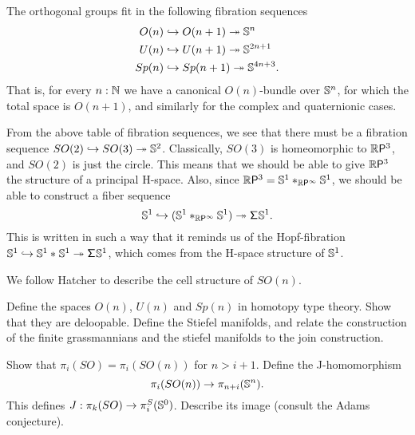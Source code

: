 \documentclass[reqno]{amsart}
\begin{document}
The orthogonal groups fit in the following fibration sequences
\begin{align*}
O(n) & \hookrightarrow O(n+1) \fibration \sphere{n} \\
U(n) & \hookrightarrow U(n+1) \fibration \sphere{2n+1} \\
Sp(n) & \hookrightarrow Sp(n+1) \fibration \sphere{4n+3}.
\end{align*}
That is, for every $n:\N$ we have a canonical $O(n)$-bundle over $\sphere{n}$, for which the total space is $O(n+1)$, and similarly for the complex and quaternionic cases.

From the above table of fibration sequences, we see that there must be a fibration sequence $SO(2)\hookrightarrow SO(3) \fibration \sphere{2}$. Classically, $SO(3)$ is homeomorphic to $\rprojective{3}$, and $SO(2)$ is just the circle. This means that we should be able to give $\rprojective{3}$ the structure of a principal H-space. Also, since $\rprojective{3}=\join[\rprojective{\infty}]{\sphere{1}}{\sphere{1}}$, we should be able to construct a fiber sequence
\begin{equation*}
\sphere{1}\hookrightarrow (\join[\rprojective{\infty}]{\sphere{1}}{\sphere{1}}) \fibration\susp{\sphere{1}}.
\end{equation*}
This is written in such a way that it reminds us of the Hopf-fibration $\sphere{1}\hookrightarrow\join{\sphere{1}}{\sphere{1}}\fibration\susp{\sphere{1}}$, which comes from the H-space structure of $\sphere{1}$. 

We follow Hatcher \cite{HatcherAT} to describe the cell structure of $SO(n)$. 

\begin{proposal}\label{p:o_u_sp}
Define the spaces $O(n)$, $U(n)$ and $Sp(n)$ in homotopy type theory. Show that
they are deloopable. Define the Stiefel manifolds, and relate the construction
of the finite grassmannians and the stiefel manifolds to the join construction.
\end{proposal}

\begin{proposal}\label{p:j_homomorphism}
Show that $\pi_i(SO)=\pi_i(SO(n))$ for $n>i+1$. Define the J-homomorphism
\begin{equation*}
\pi_i(SO(n))\to \pi_{n+i}(\sphere{n}).
\end{equation*}
This defines $J:\pi_k(SO)\to\pi_i^S(\sphere{0})$. Describe its image (consult
the Adams conjecture).
\end{proposal}
\end{document}
